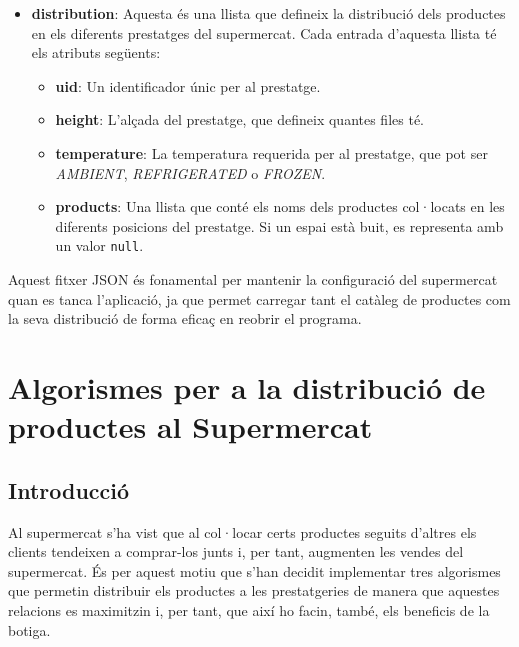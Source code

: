 \documentclass[a4paper,12pt]{report}
\begin{document}
\begin{itemize}
\begin{itemize}
	\item \textbf{distribution}: Aquesta és una llista que defineix la distribució dels productes en els diferents prestatges del supermercat. Cada entrada d'aquesta llista té els atributs següents:
	      \begin{itemize}
		      \item \textbf{uid}: Un identificador únic per al prestatge.
		      \item \textbf{height}: L'alçada del prestatge, que defineix quantes files té.
		      \item \textbf{temperature}: La temperatura requerida per al prestatge, que pot ser \textit{AMBIENT}, \textit{REFRIGERATED} o \textit{FROZEN}.
		      \item \textbf{products}: Una llista que conté els noms dels productes col·locats en les diferents posicions del prestatge. Si un espai està buit, es representa amb un valor \texttt{null}.
	      \end{itemize}
\end{itemize}

Aquest fitxer JSON és fonamental per mantenir la configuració del supermercat quan es tanca l'aplicació, ja que permet carregar tant el catàleg de productes com la seva distribució de forma eficaç en reobrir el programa.


\chapter{Algorismes per a la distribució de productes al Supermercat}

\section{Introducció}

Al supermercat s'ha vist que al col·locar certs productes seguits d'altres els clients tendeixen a comprar-los junts i, per tant, augmenten les vendes del supermercat.
És per aquest motiu que s'han decidit implementar tres algorismes que permetin distribuir els productes a les prestatgeries de manera que aquestes relacions es maximitzin i, per tant, que així ho facin, també, els beneficis de la botiga.


\end{itemize}
\end{document}
